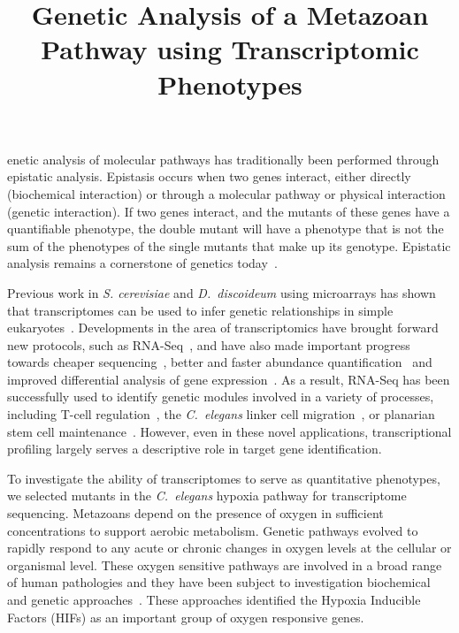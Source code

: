 \documentclass[9pt,twocolumn,twoside]{pnas-new}
\title{Genetic Analysis of a Metazoan Pathway using Transcriptomic Phenotypes}
\newcommand{\cel}{\emph{C.~elegans}}
\newcommand{\dicty}{\emph{D.~discoideum}}
\begin{document}
\verticaladjustment{-2pt}

\maketitle
\thispagestyle{firststyle}

enetic analysis of molecular pathways has traditionally been performed through epistatic analysis. Epistasis occurs when two genes interact, either directly (biochemical interaction) or through a molecular pathway or physical interaction (genetic interaction). If two genes interact, and the mutants of these genes have a quantifiable phenotype, the double mutant will have a phenotype that is not the sum of the phenotypes of the single mutants that make up its genotype. Epistatic analysis remains a cornerstone of genetics today~\cite{Phillips2008}.

Previous work in \emph{S. cerevisiae} and \dicty{} using microarrays has shown that transcriptomes can be used to infer genetic relationships in simple eukaryotes~\cite{Hughes2000, VanDriessche2005}.
Developments in the area of transcriptomics have brought forward new protocols, such as RNA-Seq~\cite{Mortazavi2008}, and have also made important progress towards cheaper sequencing~\cite{Metzker2010}, better and faster abundance quantification~\cite{Patro2014, Bray2015,Patro2015} and improved differential analysis of gene expression~\cite{Pimentel2016,Trapnell2013}.
As a result, RNA-Seq has been successfully used to identify genetic %
modules involved in a variety of processes, including T-cell regulation~\cite{Singer2016,Shalek2013}, the \cel{} linker cell migration~\cite{Schwarz2012}, or planarian stem cell maintenance~\cite{VanWolfswinkel2014,Scimone2014}. However, even in these novel applications, transcriptional profiling largely serves a descriptive role in target gene identification.

To investigate the ability of transcriptomes to serve as quantitative phenotypes, we selected mutants in the \cel{} hypoxia pathway for transcriptome sequencing.
Metazoans depend on the presence of oxygen in sufficient concentrations to  support aerobic metabolism. Genetic pathways evolved to rapidly respond to any acute or chronic changes in oxygen levels at the cellular or organismal level. These oxygen sensitive pathways are involved in a broad range of human pathologies and they have been subject to investigation biochemical and genetic approaches~\cite{Semenza2012}. These approaches identified the Hypoxia Inducible Factors (HIFs) as an important group of oxygen responsive genes.
\end{document}
